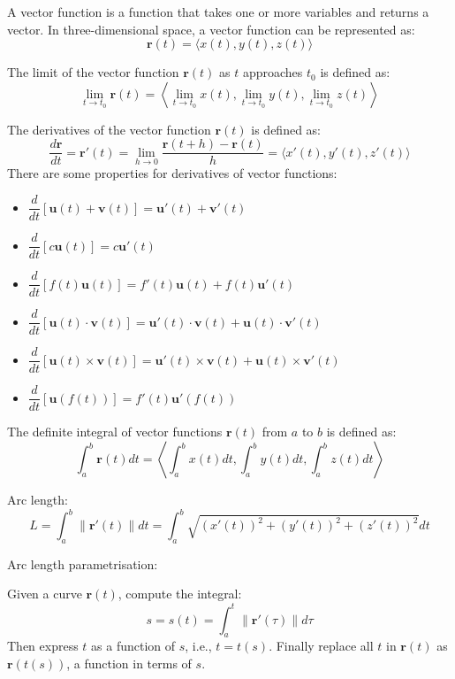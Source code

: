 \documentclass{book}
\theoremstyle{remark}
\begin{document}
A vector function is a function that takes one or more variables and returns a vector. In three-dimensional space, a vector function can be represented as:
\[
    \mathbf{r}(t) = \langle x(t), y(t), z(t) \rangle
\]

The limit of the vector function $\mathbf{r}(t)$ as $t$ approaches $t_0$ is defined as:
\[
    \lim_{t \to t_0} \mathbf{r}(t) = \left\langle \lim_{t \to t_0} x(t), \lim_{t \to t_0} y(t), \lim_{t \to t_0} z(t) \right\rangle
\]

The derivatives of the vector function $\mathbf{r}(t)$ is defined as:
\[
    \dfrac{d\mathbf{r}}{dt} = \mathbf{r}'(t) = \lim_{h \to 0} \frac{\mathbf{r}(t + h) - \mathbf{r}(t)}{h} = \langle x'(t), y'(t), z'(t) \rangle
\]
There are some properties for derivatives of vector functions:
\begin{itemize}
    \item $\dfrac{d}{dt} [\mathbf{u}(t) + \mathbf{v}(t)] = \mathbf{u}'(t) + \mathbf{v}'(t)$
    \item $\dfrac{d}{dt} [c\mathbf{u}(t)] = c\mathbf{u}'(t)$
    \item $\dfrac{d}{dt} [f(t) \mathbf{u}(t)] = f'(t) \mathbf{u}(t) + f(t) \mathbf{u}'(t)$
    \item $\dfrac{d}{dt} [\mathbf{u}(t) \cdot \mathbf{v}(t)] = \mathbf{u}'(t) \cdot \mathbf{v}(t) + \mathbf{u}(t) \cdot \mathbf{v}'(t)$
    \item $\dfrac{d}{dt} [\mathbf{u}(t) \times \mathbf{v}(t)] = \mathbf{u}'(t) \times \mathbf{v}(t) + \mathbf{u}(t) \times \mathbf{v}'(t)$
    \item $\dfrac{d}{dt} [\mathbf{u}(f(t))] = f'(t) \mathbf{u}'(f(t))$
\end{itemize}

The definite integral of vector functions $\mathbf{r}(t)$ from $a$ to $b$ is defined as:
\[
    \int_a^b \mathbf{r}(t) dt = \left\langle \int_a^b x(t) dt, \int_a^b y(t) dt, \int_a^b z(t) dt \right\rangle
\]

Arc length:
\[
    L = \int_a^b \| \mathbf{r}'(t) \| dt = \int_a^b \sqrt{(x'(t))^2 + (y'(t))^2 + (z'(t))^2} dt
\]

Arc length parametrisation:

Given a curve $\mathbf{r}(t)$, compute the integral:
\[
    s = s(t) = \int_a^t \| \mathbf{r}'(\tau) \| d\tau
\]
Then express $t$ as a function of $s$, i.e., $t = t(s)$. Finally replace all $t$ in $\mathbf{r}(t)$ as $\mathbf{r}(t(s))$, a function in terms of $s$.
\end{document}

